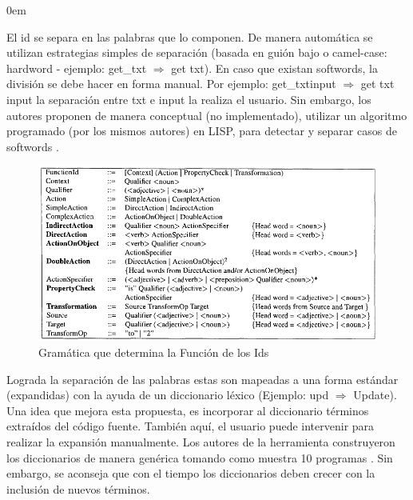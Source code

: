 \begin{description}
\itemsep0em%
\item[Segmentation:] El id se separa en las palabras que lo componen. De manera automática se utilizan estrategias simples de separación (basada en guión bajo o camel-case: hardword - ejemplo: \textsf{get\_txt} $\Rightarrow$ \textsf{get txt}). En caso que existan softwords, la división se debe hacer en forma manual. Por ejemplo: \textsf{get\_txtinput} $\Rightarrow$ \textsf{get txt input} la separación entre \textsf{txt} e \textsf{input} la realiza el usuario. Sin embargo, los autores proponen de manera conceptual (no implementado), utilizar un algoritmo programado (por los mismos autores) en LISP, para detectar y separar casos de softwords \cite{BCPT99}. 


\begin{figure}[t] %
\centerline{%
\includegraphics[scale= 0.60]{./cap3/ire_3.png}
}
\caption{Gramática que determina la Función de los Ids}
\label{ire3}
\end{figure}

\item[Standard Lexicon:] Lograda la separación de las palabras estas son mapeadas a una forma estándar (expandidas) con la ayuda de un diccionario léxico \cite{BCPT99} (Ejemplo: \textsf{upd} $\Rightarrow$ \textsf{Update}). Una idea que mejora esta propuesta, es incorporar al diccionario términos extraídos del código fuente. También aquí, el usuario puede intervenir para realizar la expansión manualmente. Los autores de la herramienta construyeron los diccionarios de manera genérica tomando como muestra 10 programas \cite{BCPT00}. Sin embargo, se aconseja que con el tiempo los diccionarios deben crecer con la inclusión de nuevos términos.


\end{description}
